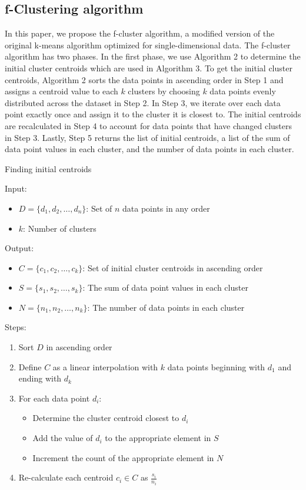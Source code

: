 \documentclass[conference,compsoc]{IEEEtran}
\begin{document}
\subsection{f-Clustering algorithm}

In this paper, we propose the f-cluster algorithm, a modified version of the original k-means algorithm optimized for single-dimensional data. The f-cluster algorithm has two phases. In the first phase, we use Algorithm 2 to determine the initial cluster centroids which are used in Algorithm 3. To get the initial cluster centroids, Algorithm 2 sorts the data points in ascending order in Step 1 and assigns a centroid value to each $k$ clusters by choosing $k$ data points evenly distributed across the dataset in Step 2. In Step 3, we iterate over each data point exactly once and assign it to the cluster it is closest to. The initial centroids are recalculated in Step 4 to account for data points that have changed clusters in Step 3. Lastly, Step 5 returns the list of initial centroids, a list of the sum of data point values in each cluster, and the number of data points in each cluster.

\begin{algorithm}\label{alg-2}
    \caption{Finding initial centroids}
    Input:
        \begin{itemize}
            \item $D = \{d_1, d_2, \dots, d_n\}$: Set of $n$ data points in any order
            \item $k$: Number of clusters
        \end{itemize}
    Output:
        \begin{itemize}
            \item $C = \{c_1, c_2, \dots, c_k\}$: Set of initial cluster centroids in ascending order
            \item $S = \{s_1, s_2, \dots, s_k\}$: The sum of data point values in each cluster
            \item $N = \{n_1, n_2, \dots, n_k\}$: The number of data points in each cluster
        \end{itemize}
    Steps:
        \begin{enumerate}
            \item Sort $D$ in ascending order
            \item Define $C$ as a linear interpolation with $k$ data points beginning with $d_1$ and ending with $d_k$
            \item For each data point $d_i$:
            \begin{itemize}
                \item Determine the cluster centroid closest to $d_i$
                \item Add the value of $d_i$ to the appropriate element in $S$
                \item Increment the count of the appropriate element in $N$
            \end{itemize}
            \item Re-calculate each centroid $c_i \in C$ as $\frac{s_i}{n_i}$
        \end{enumerate}
\end{algorithm}
\end{document}
